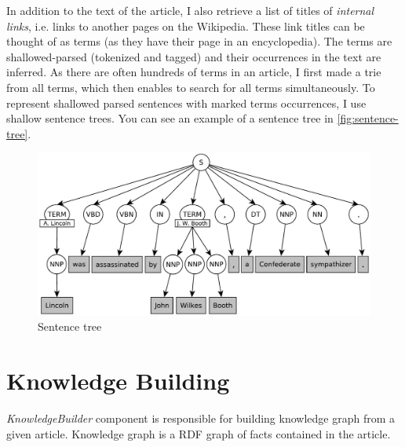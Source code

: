 \documentclass[12pt, twoside]{fithesis2}
\renewcommand{\_}{\leavevmode \kern0.07em\vbox{\hrule width0.4em}}
\begin{document}
In addition to the text of the article, I also retrieve a list of titles of \textit{internal links}, i.e. links to another pages on the Wikipedia.
These link titles can be thought of as terms (as they have their page in an encyclopedia).
The terms are shallowed-parsed (tokenized and tagged)
and their occurrences in the text are inferred.
As there are often hundreds of terms in an article,
I first made a trie from all terms, which then enables to search for all terms simultaneously.
To represent shallowed parsed sentences with marked terms occurrences,
I use shallow sentence trees.
You can see an example of a sentence tree in \autoref{fig:sentence-tree}.
\begin{figure}[h]
  \centering
  \includegraphics[width=\textwidth]{images/sentence-tree.pdf}
  \caption{Sentence tree}
  \label{fig:sentence-tree}
\end{figure}

\section{Knowledge Building}
\label{sec:smartoo-knowledge}

\textit{KnowledgeBuilder} component is responsible for building knowledge graph from a given article.
Knowledge graph is a RDF graph of facts contained in the article.

\end{document}
